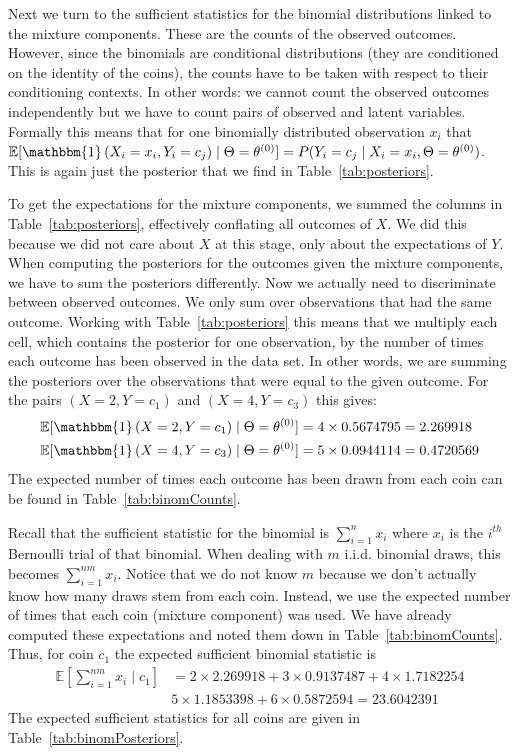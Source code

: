 \documentclass[11pt,leqno,a4paper]{report}\usepackage[]{graphicx}\usepackage[]{color}
\newcommand{\E}{\mathbb{E}}
\newcommand{\id}[1]{\mathbbm{1}\left(#1\right)}
\begin{document}
Next we turn to the sufficient statistics for the binomial distributions linked to the mixture components. These are the counts of the observed outcomes. However,
since the binomials are conditional distributions (they are conditioned on the identity of the coins), the counts have to be taken with respect to their conditioning
contexts. In other words: we cannot count the observed outcomes independently but we have to count pairs of observed and latent variables. Formally this means that 
for one binomially distributed observation $ x_{i} $ that $ \E[\id{X_{i}=x_{i},Y_{i}=c_{j}} \mid \Theta=\theta^{(0)}] = P(Y_{i}=c_{j} \mid X_{i}=x_{i}, \Theta=\theta^{(0)}) $. This is again
just the posterior that we find in Table~\ref{tab:posteriors}. 

To get the expectations for the mixture components, we summed the columns in Table~\ref{tab:posteriors}, effectively conflating all outcomes of $ X $. We did this
because we did not care about $ X $ at this stage, only about the expectations of $ Y $. When computing the posteriors for the outcomes given the mixture components,
we have to sum the posteriors differently. Now we actually need to discriminate between
observed outcomes. We only sum over observations that had the same outcome. Working with Table~\ref{tab:posteriors} this means that we multiply each
cell, which contains the posterior for one observation, by the number of times each outcome has been observed in the data set. In other words, we are summing
the posteriors over the observations that were equal to the given outcome. For the pairs $ (X=2,Y=c_{1}) $
and $ (X=4,Y = c_{3}) $ this gives:
\begin{align}
\E[\id{X=2,Y=c_{1}} \mid \Theta=\theta^{(0)}] &= 4 \times 0.5674795 = 2.269918 \\
\E[\id{X=4,Y=c_{3}} \mid \Theta=\theta^{(0)}] &= 5 \times 0.0944114 = 0.4720569
\end{align} 
The expected number of times each outcome has been drawn from each coin can be found in Table~\ref{tab:binomCounts}. 

Recall that the sufficient statistic for the binomial is 
$ \sum_{i=1}^{n} x_{i} $ where $ x_{i} $ is the $ i^{th} $ Bernoulli trial of that binomial. 
When dealing with $ m $ i.i.d. binomial draws, this becomes $ \sum_{i=1}^{nm} x_{i} $. Notice that we do not
know $ m $ because we don't actually know how many draws stem from each coin. Instead, we use the expected number of times
that each coin (mixture component) was used. We have already computed these expectations and noted them down in Table~\ref{tab:binomCounts}. Thus, for coin $ c_{1} $
the expected sufficient binomial statistic is
\begin{align}
\E\left[\sum_{i=1}^{nm} x_{i}\mid c_{1}\right] &= 2 \times 2.269918 + 3 \times 0.9137487 + 4 \times 1.7182254  \\
&5 \times 1.1853398 + 6 \times 0.5872594 = 23.6042391 \nonumber
\end{align}
The expected sufficient statistics for all coins are given in Table~\ref{tab:binomPosteriors}.
\end{document}
